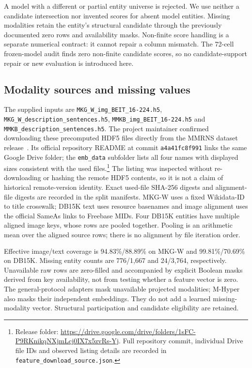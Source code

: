 \documentclass[11pt,a4paper]{article}
\begin{document}
A model with a different or partial entity universe is rejected. We use neither a candidate intersection nor invented scores for absent model entities. Missing modalities retain the entity's structural candidate through the previously documented zero rows and availability masks. Non-finite score handling is a separate numerical contract: it cannot repair a column mismatch. The 72-cell frozen-model audit finds zero non-finite candidate scores, so no candidate-support repair or new evaluation is introduced here.

\FloatBarrier
\subsection{Modality sources and missing values}

The supplied inputs are \texttt{MKG\_W\_img\_BEIT\_16-224.h5}, \texttt{MKG\_W\_description\_sentences.h5}, \texttt{MMKB\_img\_BEIT\_16-224.h5} and \texttt{MMKB\_description\_sentences.h5}. The project maintainer confirmed downloading these precomputed HDF5 files directly from the MMRNS dataset release~\citep{mkgw_origin}. Its official repository README at commit \texttt{a4a41fc8f991} links the same Google Drive folder; the \texttt{emb\_data} subfolder lists all four names with displayed sizes consistent with the used files.\footnote{Release folder: \url{https://drive.google.com/drive/folders/1sFC-P9RKnikqNXjmLcj0IX7x5zvRs-Yj}. Full repository commit, individual Drive file IDs and observed listing details are recorded in \texttt{feature\_download\_source.json}.} The listing was inspected without re-downloading or hashing the remote HDF5 contents, so it is not a claim of historical remote-version identity. Exact used-file SHA-256 digests and alignment-file digests are recorded in the split manifests. MKG-W uses a fixed Wikidata-ID to title crosswalk; DB15K text uses resource basenames and image alignment uses the official SameAs links to Freebase MIDs. Four DB15K entities have multiple aligned image keys, whose rows are pooled together. Pooling is an arithmetic mean over the aligned source rows; there is no alignment by file iteration order.

Effective image/text coverage is 94.83\%/88.89\% on MKG-W and 99.81\%/70.69\% on DB15K. Missing entity counts are 776/1,667 and 24/3,764, respectively. Unavailable raw rows are zero-filled and accompanied by explicit Boolean masks derived from key availability, not from testing whether a feature vector is zero. The general-protocol adapters mask unavailable projected modalities; M-Hyper also masks their independent embeddings. They do not add a learned missing-modality vector. Structural participation and candidate eligibility are retained.
\end{document}
